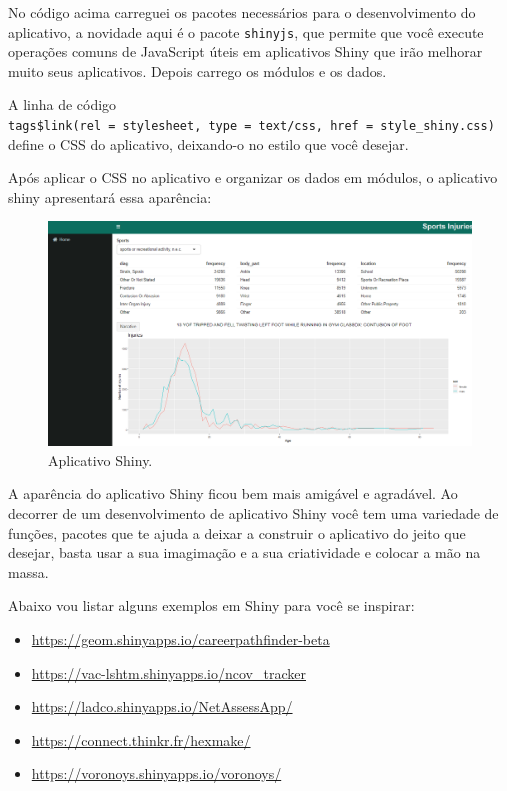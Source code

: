 \documentclass[
]{book}
\providecommand{\tightlist}{%
  \setlength{\itemsep}{0pt}\setlength{\parskip}{0pt}}
\begin{document}
No código acima carreguei os pacotes necessários para o desenvolvimento do aplicativo, a novidade aqui é o pacote \texttt{shinyjs}, que permite que você execute operações comuns de JavaScript úteis em aplicativos Shiny que irão melhorar muito seus aplicativos. Depois carrego os módulos e os dados.

A linha de código \texttt{tags\$link(rel\ =\ \textquotesingle{}stylesheet\textquotesingle{},\ type\ =\ \textquotesingle{}text/css\textquotesingle{},\ href\ =\ \textquotesingle{}style\_shiny.css\textquotesingle{})} define o CSS do aplicativo, deixando-o no estilo que você desejar.

Após aplicar o CSS no aplicativo e organizar os dados em módulos, o aplicativo shiny apresentará essa aparência:

\begin{figure}

{\centering \includegraphics[width=1\linewidth]{www/img/apli_final} 

}

\caption{Aplicativo Shiny.}\label{fig:unnamed-chunk-54}
\end{figure}

A aparência do aplicativo Shiny ficou bem mais amigável e agradável. Ao decorrer de um desenvolvimento de aplicativo Shiny você tem uma variedade de funções, pacotes que te ajuda a deixar a construir o aplicativo do jeito que desejar, basta usar a sua imagimação e a sua criatividade e colocar a mão na massa.

Abaixo vou listar alguns exemplos em Shiny para você se inspirar:

\begin{itemize}
\tightlist
\item
  \url{https://geom.shinyapps.io/careerpathfinder-beta}
\item
  \url{https://vac-lshtm.shinyapps.io/ncov_tracker}
\item
  \url{https://ladco.shinyapps.io/NetAssessApp/}
\item
  \url{https://connect.thinkr.fr/hexmake/}
\item
  \url{https://voronoys.shinyapps.io/voronoys/}
\end{itemize}
\end{document}
